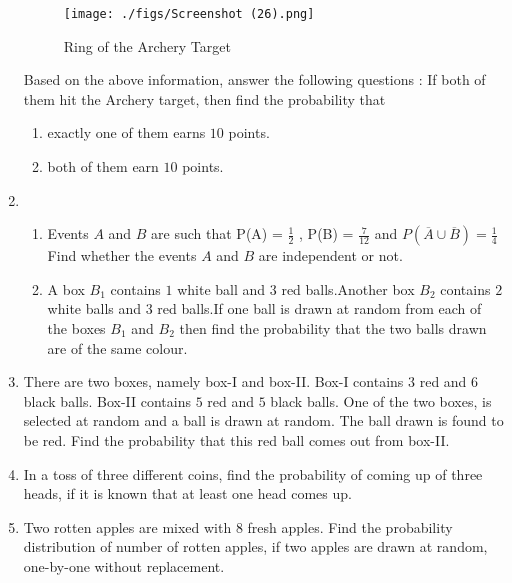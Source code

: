 \documentclass{article}
\theoremstyle{remark}
\begin{document}
\begin{enumerate}[label=\arabic*.,ref=\theenumi]
\begin{figure}[H]
        \centering
        \texttt{[image: ./figs/Screenshot (26).png]}
        \caption{Ring of the Archery Target}
        \label{fig:fig4.png}
    \end{figure}

Based on the above information, answer the following questions : 
If both of them hit the Archery target, then find the probability that 

\begin{enumerate}[label=(\alph*)]
    
 \item  exactly one of them earns $10$ points.
 
 \item  both of them earn $10$ points.

\end{enumerate}


\item 
\begin{enumerate}[label=(\alph*)]
    
 \item  Events $A$ and $B$ are such that
 P(A) =  $\frac{1}{2}$ , P(B) =  $\frac{7}{12}$  and $ P( \overline{A}  \cup  \overline{B} )= \frac{1}{4}$ Find whether the events $A$ and $B$ are independent or not.
 
 \item  A box $B_{1}$ contains $1$ white ball and $3$ red balls.Another box $B_{2}$ contains $2$ white balls and $3$ red balls.If one ball is drawn at random from each of the boxes $B_{1}$ and $B_{2}$ then find the probability that the two balls drawn are of the same colour.
 
\end{enumerate}

 \item There are two boxes, namely box-I and box-II. Box-I contains $3$ red and $6$ black balls. Box-II contains $5$ red and $5$ black balls. One of the two boxes, is selected at random and a ball is drawn at random. The ball drawn is found to be red. Find the probability that this red ball comes out from box-II.

\item In a toss of three different coins, find the probability of coming up of three heads, if it is known that at least one head comes up.

\item Two rotten apples are mixed with $8$ fresh apples. Find the probability distribution of number of rotten apples, if two apples are drawn at random, one-by-one without replacement.


\end{enumerate}
\end{document}
